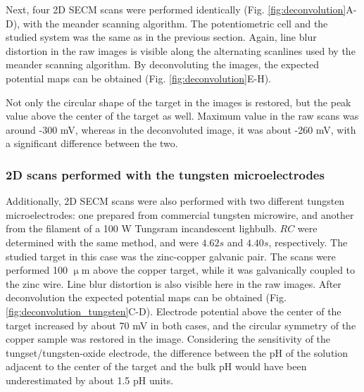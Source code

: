 Next, four 2D SECM scans were performed identically (Fig. \ref{fig:deconvolution}A-D), with the meander scanning algorithm.
The potentiometric cell and the studied system was the same as in the previous section.
Again, line blur distortion in the raw images is visible along the alternating scanlines used by the meander scanning algorithm.
By deconvoluting the images, the expected potential maps can be obtained (Fig. \ref{fig:deconvolution}E-H). 

Not only the circular shape of the target in the images is restored, but the peak value above the center of the target as well.
Maximum value in the raw scans was around -300 mV, whereas in the deconvoluted image, it was about -260 mV, with a significant difference between the two. 

			\subsubsection{2D scans performed with the tungsten microelectrodes}
Additionally, 2D SECM scans were also performed with two different tungsten microelectrodes: one prepared from commercial tungsten microwire, and another from the filament of a 100 W Tungsram incandescent lighbulb.
$RC$ were determined with the same method, and were $4.62 s$ and $4.40s$, respectively.
The studied target in this case was the zinc-copper galvanic pair.
The scans were performed 100 $\upmu$m above the copper target, while it was galvanically coupled to the zinc wire.
Line blur distortion is also visible here in the raw images.
After deconvolution the expected potential maps can be obtained (Fig. \ref{fig:deconvolution_tungsten}C-D).
Electrode potential above the center of the target increased by about 70 mV in both cases, and the circular symmetry of the copper sample was restored in the image.
Considering the sensitivity of the tungset/tungsten-oxide electrode, the difference between the pH of the solution adjacent to the center of the target and the bulk pH would have been underestimated by about 1.5 pH units.

